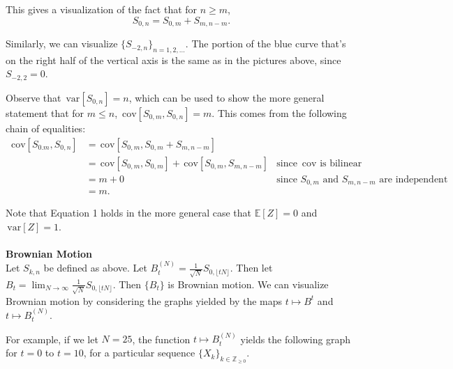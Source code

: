 \documentclass{article}
\theoremstyle{definition}
\newcommand{\E}{\mathbb{E}}
\newcommand{\Z}{\mathbb{Z}}
\newcommand{\var}{\,\mathrm{var}}
\newcommand{\cov}{\,\mathrm{cov}}
\newcommand{\style}{\displaystyle} %
\begin{document}
This gives a visualization of the fact that for $n\geq m$, \[S_{0,n}=S_{0,m}+S_{m,n-m}.\]

Similarly, we can visualize $\{S_{-2,n}\}_{n=1,2,\dots}$.  The portion of the blue curve that's on the right half of the vertical axis is the same as in the pictures above, since $S_{-2,2}=0$.

\begin{center}
\end{center}

Observe that $\var[S_{0,n}]=n$, which can be used to show the more general statement that for $m\leq n$, $\cov[S_{0,m},S_{0,n}]=m$.  This comes from the following chain of equalities:
\begin{align*}
\cov[S_{0.m},S_{0,n}]&=\cov[S_{0,m},S_{0,m}+S_{m,n-m}]\\
&=\cov[S_{0,m},S_{0,m}]+\cov[S_{0,m},S_{m,n-m}]&\text{since }\cov\text{ is bilinear}\\
&=m+0&\text{since }S_{0,m}\text{ and }S_{m,n-m}\text{ are independent}\\
&=m.
\end{align*}

Note that Equation 1 holds in the more general case that $\E[Z]=0$ and $\var[Z]=1$.\\\\

\textbf{\Large Brownian Motion}\\

Let $S_{k,n}$ be defined as above.  Let $\style B_t^{(N)}=\frac{1}{\sqrt{N}}S_{0,\lfloor tN\rfloor}$.  Then let $\style B_t=\lim_{N\to\infty}\frac{1}{\sqrt{N}}S_{0,\lfloor tN\rfloor}$.  Then $\{B_t\}$ is Brownian motion.  We can visualize Brownian motion by considering the graphs yielded by the maps $t\mapsto B^t$ and $t\mapsto B_t^{(N)}$.

For example, if we let $N=25$, the function $t\mapsto B_t^{(N)}$ yields the following graph for $t=0$ to $t=10$, for a particular sequence $\{X_k\}_{k\in\Z_{\geq 0}}$.
\end{document}
